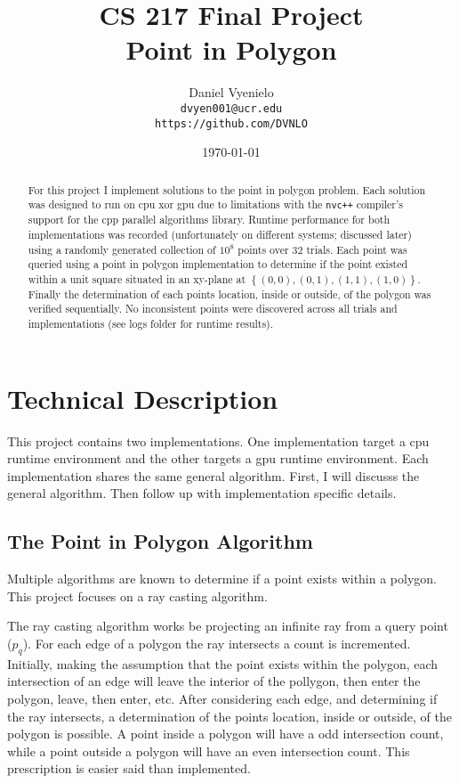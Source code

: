 \documentclass{article}
\begin{document}
\title{CS 217 Final Project \\ Point in Polygon}
\author{Daniel Vyenielo\\
		\texttt{dvyen001@ucr.edu}\\
		\texttt{https://github.com/DVNLO}}
\date{\today}
\maketitle

\begin{abstract}
For this project I implement solutions to the point in polygon problem. Each solution was designed to run on cpu xor gpu due to limitations with the \texttt{nvc++} compiler's support for the cpp parallel algorithms library. Runtime performance for both implementations was recorded (unfortunately on different systems; discussed later) using a randomly generated collection of $10^8$ points over 32 trials. Each point was queried using a point in polygon implementation to determine if the point existed within a unit square situated in an xy-plane at $\left\lbrace (0,0), (0,1), (1,1), (1,0) \right\rbrace$. Finally the determination of each points location, inside or outside, of the polygon was verified sequentially. No inconsistent points were discovered across all trials and implementations (see logs folder for runtime results).
\end{abstract}

\section{Technical Description}
This project contains two implementations. One implementation target a cpu runtime environment and the other targets a gpu runtime environment. Each implementation shares the same general algorithm. First, I will discusss the general algorithm. Then follow up with implementation specific details.

\subsection{The Point in Polygon Algorithm}
Multiple algorithms are known to determine if a point exists within a polygon. This project focuses on a ray casting algorithm. 

The ray casting algorithm works be projecting an infinite ray from a query point ($p_q$). For each edge of a polygon the ray intersects a count is incremented. Initially, making the assumption that the point exists within the polygon, each intersection of an edge will leave the interior of the pollygon, then enter the polygon, leave, then enter, etc. After considering each edge, and determining if the ray intersects, a determination of the points location, inside or outside, of the polygon is possible. A point inside a polygon will have a odd intersection count, while a point outside a polygon will have an even intersection count. This prescription is easier said than implemented. 
\end{document}
